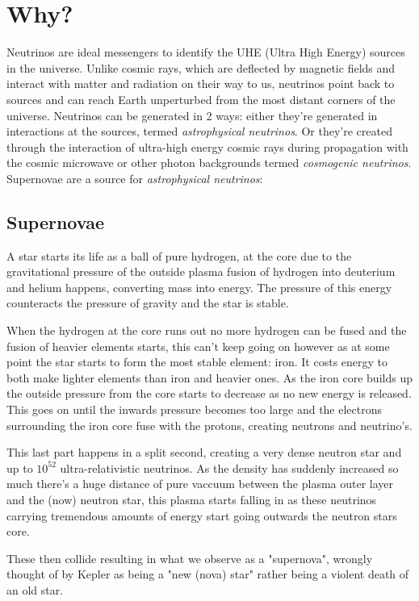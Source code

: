 \documentclass[11pt,a4paper,faculty=we,language=en,doctype=report]{cls/ugent-doc}
\begin{document}
\section{Why?}
Neutrinos are ideal messengers to identify the UHE (Ultra High Energy) sources
in the universe. Unlike cosmic rays, which are deflected by magnetic fields and
interact with matter and radiation on their way to us, neutrinos point back to
sources and can reach Earth unperturbed from the most distant corners of the
universe.  Neutrinos can be generated in 2 ways: either they're generated in
interactions at the sources, termed \textit{astrophysical neutrinos}. Or
they're created through the interaction of ultra-high energy cosmic rays during
propagation with the cosmic microwave or other photon backgrounds termed
\textit{cosmogenic neutrinos}. 
Supernovae are a source for \textit{astrophysical neutrinos}:
\subsection{Supernovae}
A star starts its life as a ball of pure hydrogen, at the core due to the
gravitational pressure of the outside plasma fusion of hydrogen into deuterium
and helium happens, converting mass into energy. The pressure of this energy
counteracts the pressure of gravity and the star is stable.

When the hydrogen at the core runs out no more hydrogen can be fused and the
fusion of heavier elements starts, this can't keep going on however as at some
point the star starts to form the most stable element: iron.  It costs energy
to both make lighter elements than iron and heavier ones.  As the iron core
builds up the outside pressure from the core starts to decrease as no new
energy is released. This goes on until the inwards pressure becomes too large
and the electrons surrounding the iron core fuse with the protons, 
creating neutrons and neutrino's.

This last part happens in a split second, creating a very dense neutron star
and up to $10^{52}$ ultra-relativistic neutrinos. As the density has suddenly
increased so much there's a huge distance of pure vaccuum between the plasma
outer layer and the (now) neutron star, this plasma starts falling in as these
neutrinos carrying tremendous amounts of energy start going outwards the neutron
stars core.

These then collide resulting in what we observe as a "supernova", wrongly
thought of by Kepler as being a "new (nova) star" rather being a violent death
of an old star.
\end{document}
